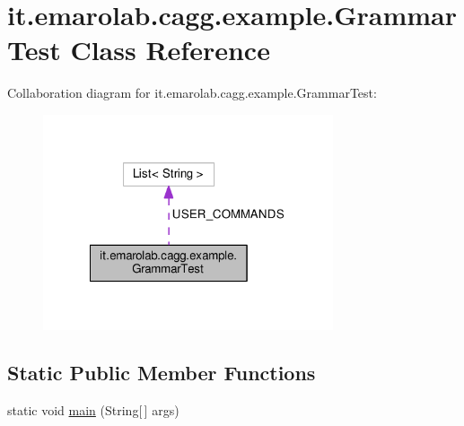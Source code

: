 \hypertarget{classit_1_1emarolab_1_1cagg_1_1example_1_1GrammarTest}{\section{it.\-emarolab.\-cagg.\-example.\-Grammar\-Test Class Reference}
\label{classit_1_1emarolab_1_1cagg_1_1example_1_1GrammarTest}
}


Collaboration diagram for it.\-emarolab.\-cagg.\-example.\-Grammar\-Test\-:\nopagebreak
\begin{figure}[H]
\begin{center}
\leavevmode
\includegraphics[width=242pt]{classit_1_1emarolab_1_1cagg_1_1example_1_1GrammarTest__coll__graph}
\end{center}
\end{figure}
\subsection*{Static Public Member Functions}
\begin{DoxyCompactItemize}
\item 
static void \hyperlink{classit_1_1emarolab_1_1cagg_1_1example_1_1GrammarTest_abfc855d8ee69285474b1db0985ced7da}{main} (String\mbox{[}$\,$\mbox{]} args)
\end{DoxyCompactItemize}
